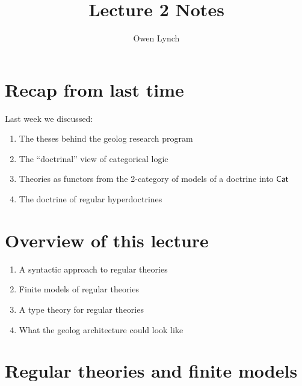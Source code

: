 \documentclass{acmart}
\begin{document}
\title{Lecture 2 Notes}
\author{Owen Lynch}

\maketitle

\section{Recap from last time}

Last week we discussed:

\begin{enumerate}
  \item The theses behind the geolog research program
  \item The ``doctrinal'' view of categorical logic
  \item Theories as functors from the 2-category of models of a doctrine into $\mathsf{Cat}$
  \item The doctrine of regular hyperdoctrines
\end{enumerate}

\section{Overview of this lecture}

\begin{enumerate}
  \item A syntactic approach to regular theories
  \item Finite models of regular theories
  \item A type theory for regular theories
  \item What the geolog architecture could look like
\end{enumerate}

\section{Regular theories and finite models}
\end{document}
